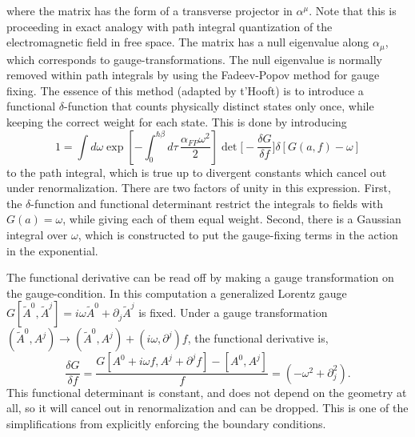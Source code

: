 where the matrix has the form of a transverse projector in $\alpha^\mu$.  Note that this is proceeding
in exact analogy with path integral quantization of the electromagnetic field in free space.  
The matrix has a null eigenvalue along $\alpha_\mu$, which corresponds to gauge-transformations.  
The null eigenvalue is normally removed within path integrals by using the Fadeev-Popov method for gauge fixing. 
The essence of this method (adapted by t'Hooft) is to introduce a functional $\delta$-function that counts physically
distinct states only once, while keeping the correct weight for each state.  
This is done by introducing 
\begin{equation}
  1 = \int d\omega \exp\left[-\int_0^{\hbar\beta}d\tau\,\frac{\alpha_{FP}\omega^2}{2} \right]
  \det\bigg[-\frac{\delta G}{\delta f}\bigg]\delta[G(a,f)-\omega]
\end{equation}
to the path integral, which is true up to divergent constants which cancel out under renormalization.
There are two factors of unity in this expression. First, the $\delta$-function and functional
 determinant restrict the integrals to fields with $G(a)=\omega$, while giving each of them equal weight.
Second, there is a Gaussian integral over $\omega$, which is constructed to put the gauge-fixing 
terms in the action in the exponential.

The functional derivative can be read off by making a gauge transformation on the gauge-condition.
In this computation a generalized Lorentz gauge $G[\tilde{A}^0,\tilde{A}^j] = i\omega \tilde{A}^0 + \partial_j \tilde{A}^j$
is fixed.  Under a gauge transformation
  $(\tilde{A}^0,A^j)\rightarrow  (\tilde{A}^0,A^j) + (i\omega,\partial^j)f$,
the functional derivative is, 
\begin{equation}
  \frac{\delta G}{\delta f} = \frac{G[A^0+i\omega f,A^j+\partial^jf]  -[A^0,A^j]}{f}
  = (-\omega^2 +\partial_j^2).
\end{equation}
This functional determinant is constant, and does not depend on the geometry at all, so it will cancel 
out in renormalization and can be dropped.
This is one of the simplifications from explicitly enforcing the boundary conditions.  

